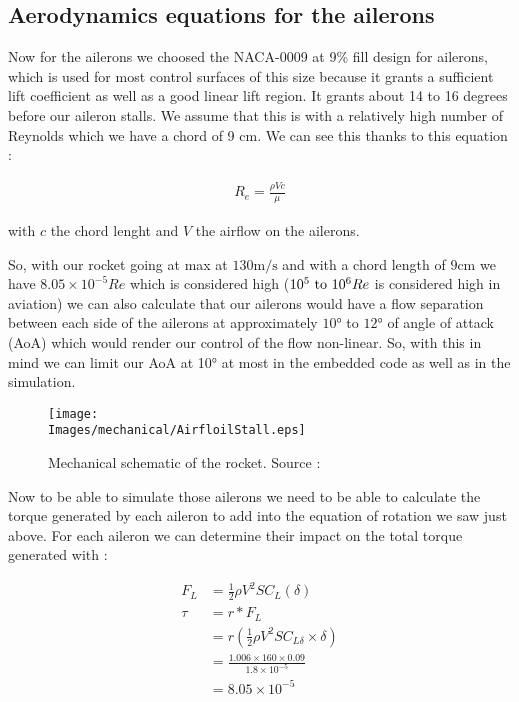 \subsection{Aerodynamics equations for the ailerons}

Now for the ailerons we choosed the NACA-0009 at 9\% fill design for ailerons,
which is used for most control surfaces of this size because it grants a
sufficient lift coefficient as well as a good linear lift region. It grants
about 14 to 16 degrees before our aileron stalls. We assume that this is with a
relatively high number of Reynolds which we have a chord of 9 cm. We can see
this thanks to this equation :

\begin{gather*}
    R_e = \frac{\rho V c}{\mu}
\end{gather*}

with $c$ the chord lenght and $V$ the airflow on the ailerons.

So, with our rocket going at max at $130 \si{\meter\per\second}$ and with a
chord length of $9 \si{\centi\meter}$ we have $8.05 \times 10^{-5} Re$ which is
considered high ($10^5 \text{ to } 10^6 \space Re$ is considered high in
aviation) we can also calculate that our ailerons would have a flow separation
between each side of the ailerons at approximately $10 \si{\degree}$ to $12
    \si{\degree}$ of angle of attack (AoA) which would render our control of the
flow non-linear. So, with this in mind we can limit our AoA at 10° at most in
the embedded code as well as in the simulation.

\begin{figure}[!hbt]
    \centering
    \texttt{[image: \\Images/mechanical/AirfloilStall.eps]}
    \caption{Mechanical schematic of the rocket. Source : \cite{FlowSeparation}}
\end{figure}
\FloatBarrier

Now to be able to simulate those ailerons we need to be able to calculate the
torque generated by each aileron to add into the equation of rotation we saw
just above. For each aileron we can determine their impact on the total torque
generated with :

\begin{align*}
    F_L  & = \frac{1}{2} \rho V^2 S C_L (\delta)                     \\
    \tau & = r * F_L                                                 \\
         & = r ( \frac{1}{2} \rho V^2 S C_{L \delta} \times \delta)  \\
         & = \frac{1.006 \times 160 \times 0.09}{1.8 \times 10^{-5}} \\
         & = 8.05 \times 10^{-5}                                     \\
\end{align*}


